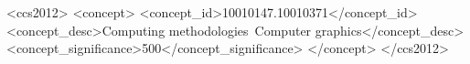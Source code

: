 %
%
  
\begin{CCSXML}
<ccs2012>
<concept>
<concept_id>10010147.10010371</concept_id>
<concept_desc>Computing methodologies~Computer graphics</concept_desc>
<concept_significance>500</concept_significance>
</concept>
</ccs2012>
\end{CCSXML}


